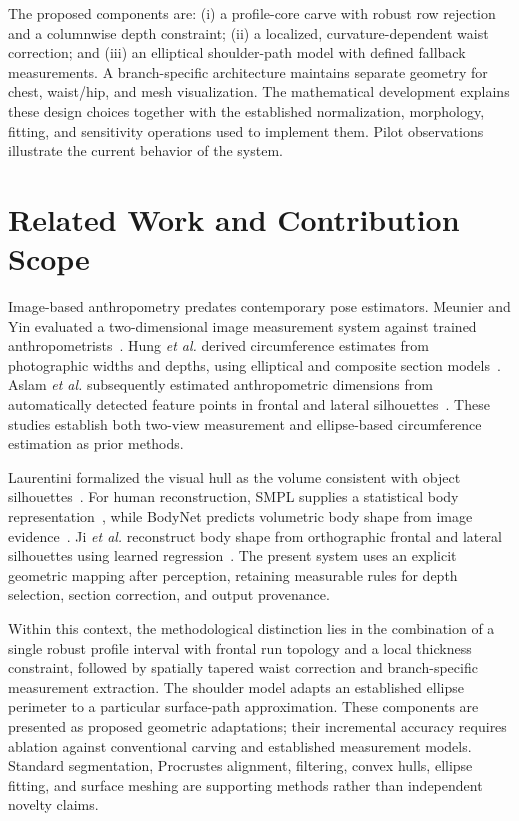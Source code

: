 \documentclass[11pt,a4paper]{article}
\numberwithin{equation}{section}
\begin{document}
The proposed components are: (i) a profile-core carve with robust row rejection and a columnwise depth constraint; (ii) a localized, curvature-dependent waist correction; and (iii) an elliptical shoulder-path model with defined fallback measurements. A branch-specific architecture maintains separate geometry for chest, waist/hip, and mesh visualization. The mathematical development explains these design choices together with the established normalization, morphology, fitting, and sensitivity operations used to implement them. Pilot observations illustrate the current behavior of the system.

\section{Related Work and Contribution Scope}
Image-based anthropometry predates contemporary pose estimators. Meunier and Yin evaluated a two-dimensional image measurement system against trained anthropometrists~\cite{meunier2000}. Hung \emph{et al.} derived circumference estimates from photographic widths and depths, using elliptical and composite section models~\cite{hung2004}. Aslam \emph{et al.} subsequently estimated anthropometric dimensions from automatically detected feature points in frontal and lateral silhouettes~\cite{aslam2017}. These studies establish both two-view measurement and ellipse-based circumference estimation as prior methods.

Laurentini formalized the visual hull as the volume consistent with object silhouettes~\cite{laurentini1994visual}. For human reconstruction, SMPL supplies a statistical body representation~\cite{loper2015smpl}, while BodyNet predicts volumetric body shape from image evidence~\cite{varol2018bodynet}. Ji \emph{et al.} reconstruct body shape from orthographic frontal and lateral silhouettes using learned regression~\cite{ji2019}. The present system uses an explicit geometric mapping after perception, retaining measurable rules for depth selection, section correction, and output provenance.

Within this context, the methodological distinction lies in the combination of a single robust profile interval with frontal run topology and a local thickness constraint, followed by spatially tapered waist correction and branch-specific measurement extraction. The shoulder model adapts an established ellipse perimeter to a particular surface-path approximation. These components are presented as proposed geometric adaptations; their incremental accuracy requires ablation against conventional carving and established measurement models. Standard segmentation, Procrustes alignment, filtering, convex hulls, ellipse fitting, and surface meshing are supporting methods rather than independent novelty claims.
\end{document}
